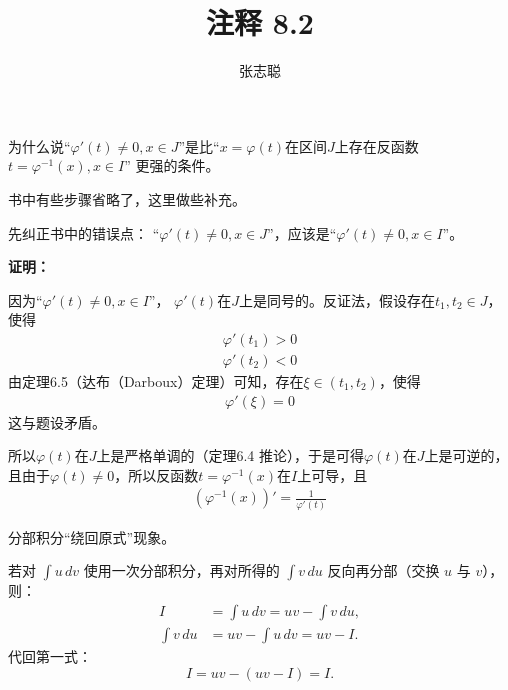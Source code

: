 \documentclass{article}
\begin{document}
\title{注释 8.2}
\author{张志聪}
\maketitle

\begin{zremark}
  为什么说“$\varphi'(t) \neq 0, x \in J$”是比“$x = \varphi(t)$在区间$J$上存在反函数$t = \varphi^{-1}(x), x \in I$”
  更强的条件。

  书中有些步骤省略了，这里做些补充。
\end{zremark}

先纠正书中的错误点：
“$\varphi'(t) \neq 0, x \in J$”，应该是“$\varphi'(t) \neq 0, x \in I$”。

\textbf{证明：}

因为“$\varphi'(t) \neq 0, x \in I$”，
$\varphi'(t)$在$J$上是同号的。反证法，假设存在$t_1, t_2 \in J$，使得
\begin{align*}
  \varphi'(t_1) > 0 \\
  \varphi'(t_2) < 0
\end{align*}
由定理6.5（达布（Darboux）定理）可知，存在$\xi \in (t_1, t_2)$，使得
\begin{align*}
  \varphi'(\xi) = 0
\end{align*}
这与题设矛盾。

所以$\varphi(t)$在$J$上是严格单调的（定理6.4 推论），于是可得$\varphi(t)$在$J$上是可逆的，
且由于$\varphi(t) \neq 0$，所以反函数$t = \varphi^{-1}(x)$在$I$上可导，且
\begin{align*}
  (\varphi^{-1}(x))' = \frac{1}{\varphi'(t)}
\end{align*}

\begin{zremark}
  分部积分“绕回原式”现象。
\end{zremark}

若对 $\int u \, dv$ 使用一次分部积分，再对所得的 $\int v \, du$ 反向再分部（交换 $u$ 与 $v$），则：
\[
  \begin{aligned}
    I          & = \int u \, dv = uv - \int v \, du, \\
    \int v \, du & = uv - \int u \, dv = uv - I.
  \end{aligned}
\]
代回第一式：
\[
  I = uv - (uv - I) = I.
\]
\end{document}
